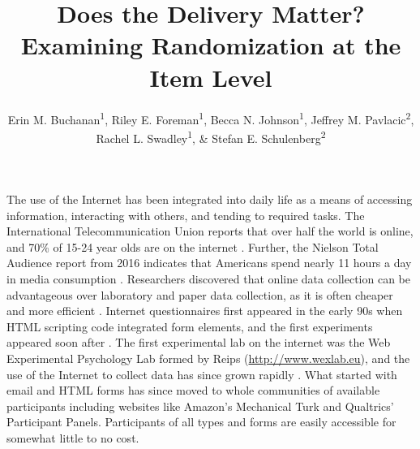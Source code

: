 \documentclass[english,man, mask]{apa6}
\title{Does the Delivery Matter? Examining Randomization at the Item Level}
\author{Erin M. Buchanan\textsuperscript{1}, Riley E. Foreman\textsuperscript{1}, Becca N. Johnson\textsuperscript{1}, Jeffrey M. Pavlacic\textsuperscript{2}, Rachel L. Swadley\textsuperscript{1}, \& Stefan E. Schulenberg\textsuperscript{2}}
\affiliation{
    \vspace{0.5cm}
          \textsuperscript{1} Missouri State University\\
          \textsuperscript{2} University of Mississippi  }
\theoremstyle{definition}
\theoremstyle{definition}
\theoremstyle{definition}
\theoremstyle{remark}
\begin{document}
\maketitle

\setcounter{secnumdepth}{0}



The use of the Internet has been integrated into daily life as a means
of accessing information, interacting with others, and tending to
required tasks. The International Telecommunication Union reports that
over half the world is online, and 70\% of 15-24 year olds are on the
internet \autocite{Sanou2017}. Further, the Nielson Total Audience
report from 2016 indicates that Americans spend nearly 11 hours a day in
media consumption \autocite{Media2016}. Researchers discovered that
online data collection can be advantageous over laboratory and paper
data collection, as it is often cheaper and more efficient
\autocites{Ilieva2001}{Schuldt1994}{Reips2012}. Internet questionnaires
first appeared in the early 90s when HTML scripting code integrated form
elements, and the first experiments appeared soon after
\autocites{Musch2000}{Reips2002a}. The first experimental lab on the
internet was the Web Experimental Psychology Lab formed by Reips
(\url{http://www.wexlab.eu}), and the use of the Internet to collect
data has since grown rapidly \autocite{Reips2002a}. What started with
email and HTML forms has since moved to whole communities of available
participants including websites like Amazon's Mechanical Turk and
Qualtrics' Participant Panels. Participants of all types and forms are
easily accessible for somewhat little to no cost.
\end{document}
